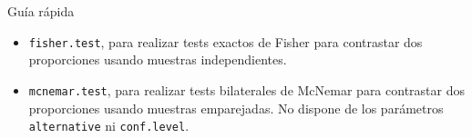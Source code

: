 \documentclass[
  ignorenonframetext,
]{beamer}
\begin{document}
\begin{frame}[fragile]{Guía rápida}
\protect\hypertarget{guuxeda-ruxe1pida-3}{}
\begin{itemize}
\item
  \texttt{fisher.test}, para realizar tests exactos de Fisher para
  contrastar dos proporciones usando muestras independientes.
\item
  \texttt{mcnemar.test}, para realizar tests bilaterales de McNemar para
  contrastar dos proporciones usando muestras emparejadas. No dispone de
  los parámetros \texttt{alternative} ni \texttt{conf.level}.
\end{itemize}
\end{frame}
\end{document}
